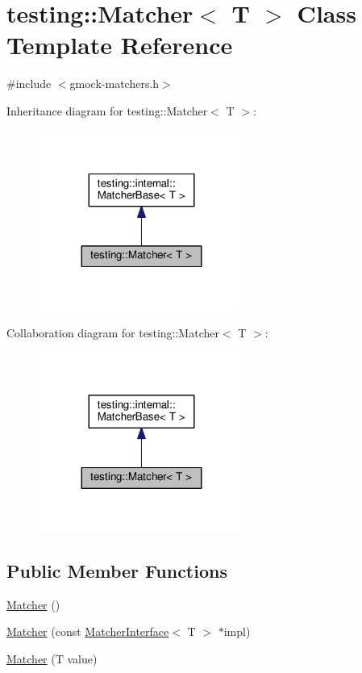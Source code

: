 \hypertarget{classtesting_1_1Matcher}{}\section{testing\+:\+:Matcher$<$ T $>$ Class Template Reference}
\label{classtesting_1_1Matcher}


{\ttfamily \#include $<$gmock-\/matchers.\+h$>$}



Inheritance diagram for testing\+:\+:Matcher$<$ T $>$\+:
\nopagebreak
\begin{figure}[H]
\begin{center}
\leavevmode
\includegraphics[width=191pt]{classtesting_1_1Matcher__inherit__graph}
\end{center}
\end{figure}


Collaboration diagram for testing\+:\+:Matcher$<$ T $>$\+:
\nopagebreak
\begin{figure}[H]
\begin{center}
\leavevmode
\includegraphics[width=191pt]{classtesting_1_1Matcher__coll__graph}
\end{center}
\end{figure}
\subsection*{Public Member Functions}
\begin{DoxyCompactItemize}
\item 
\hyperlink{classtesting_1_1Matcher_a57bfc9e62d7f6acfee5ad88d1077931c}{Matcher} ()
\item 
\hyperlink{classtesting_1_1Matcher_aea32eb3f86233853de91929fb2691bf3}{Matcher} (const \hyperlink{classtesting_1_1MatcherInterface}{Matcher\+Interface}$<$ T $>$ $\ast$impl)
\item 
\hyperlink{classtesting_1_1Matcher_adc75e0bd47ffc75ba8a5f760372d0493}{Matcher} (T value)
\end{DoxyCompactItemize}
